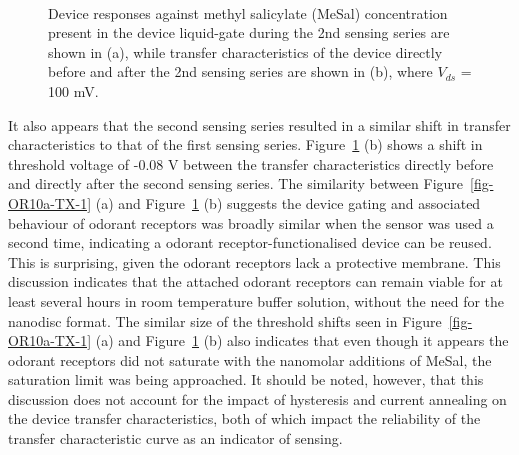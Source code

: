 \documentclass[
  a4paper,
]{scrbook}
\begin{document}
\begin{figure}
\begin{minipage}[t]{0.45\linewidth}
{{}

}

\end{minipage}%
%
\begin{minipage}[t]{0.01\linewidth}

{\centering 

~

}

\end{minipage}%

\caption{\label{fig-OR10a-signal-TX}Device responses against methyl
salicylate (MeSal) concentration present in the device liquid-gate
during the 2nd sensing series are shown in (a), while transfer
characteristics of the device directly before and after the 2nd sensing
series are shown in (b), where \(V_{ds}\) = 100 mV.}

\end{figure}

It also appears that the second sensing series resulted in a similar
shift in transfer characteristics to that of the first sensing series.
Figure~\ref{fig-OR10a-signal-TX} (b) shows a shift in threshold voltage
of -0.08 V between the transfer characteristics directly before and
directly after the second sensing series. The similarity between
Figure~\ref{fig-OR10a-TX-1} (a) and Figure~\ref{fig-OR10a-signal-TX} (b)
suggests the device gating and associated behaviour of odorant receptors
was broadly similar when the sensor was used a second time, indicating a
odorant receptor-functionalised device can be reused. This is
surprising, given the odorant receptors lack a protective membrane. This
discussion indicates that the attached odorant receptors can remain
viable for at least several hours in room temperature buffer solution,
without the need for the nanodisc format. The similar size of the
threshold shifts seen in Figure~\ref{fig-OR10a-TX-1} (a) and
Figure~\ref{fig-OR10a-signal-TX} (b) also indicates that even though it
appears the odorant receptors did not saturate with the nanomolar
additions of MeSal, the saturation limit was being approached. It should
be noted, however, that this discussion does not account for the impact
of hysteresis and current annealing on the device transfer
characteristics, both of which impact the reliability of the transfer
characteristic curve as an indicator of sensing.
\end{document}
